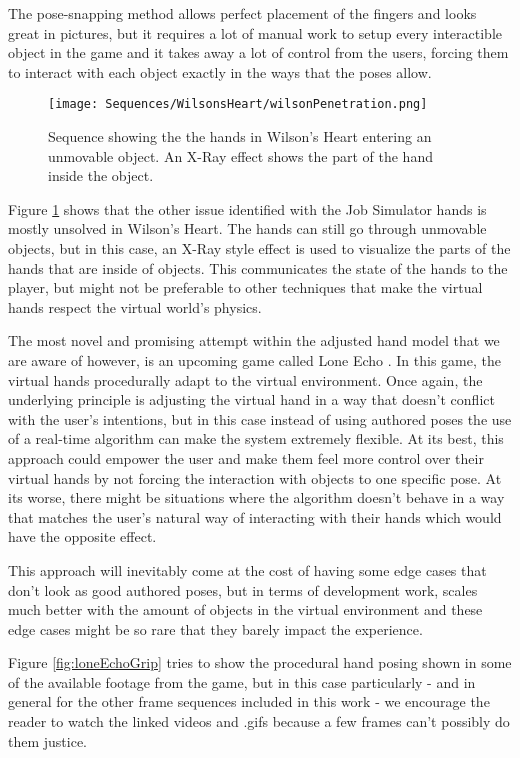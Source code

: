 The pose-snapping method allows perfect placement of the fingers and looks great in pictures, but it requires a lot of manual work to setup every interactible object in the game and it takes away a lot of control from the users, forcing them to interact with each object exactly in the ways that the poses allow.

\begin{figure}[H]
\centering
\texttt{[image: Sequences/WilsonsHeart/wilsonPenetration.png]}
\caption{Sequence showing the the hands in Wilson's Heart entering an unmovable object. An X-Ray effect shows the part of the hand inside the object.}
\label{fig:wilsonPenetration}
\end{figure}

Figure \ref{fig:wilsonPenetration} shows that the other issue identified with the Job Simulator hands is mostly unsolved in Wilson's Heart. The hands can still go through unmovable objects, but in this case, an X-Ray style effect is used to visualize the parts of the hands that are inside of objects. This communicates the state of the hands to the player, but might not be preferable to other techniques that make the virtual hands respect the virtual world's physics.

The most novel and promising attempt within the adjusted hand model that we are aware of however, is an upcoming game called Lone Echo \parencite{ReadyAtDawn}. In this game, the virtual hands procedurally adapt to the virtual environment. Once again, the underlying principle is adjusting the virtual hand in a way that doesn't conflict with the user's intentions, but in this case instead of using authored poses the use of a real-time algorithm can make the system extremely flexible. At its best, this approach could empower the user and make them feel more control over their virtual hands by not forcing the interaction with objects to one specific pose. At its worse, there might be situations where the algorithm doesn't behave in a way that matches the user's natural way of interacting with their hands which would have the opposite effect.

This approach will inevitably come at the cost of having some edge cases that don't look as good authored poses, but in terms of development work, scales much better with the amount of objects in the virtual environment and these edge cases might be so rare that they barely impact the experience.

Figure \ref{fig:loneEchoGrip} tries to show the procedural hand posing shown in some of the available footage from the game, but in this case particularly - and in general for the other frame sequences included in this work - we encourage the reader to watch the linked videos and .gifs because a few frames can't possibly do them justice.

